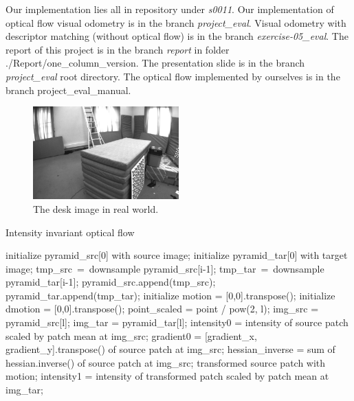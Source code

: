 \documentclass[11pt]{easychair}
\begin{document}
\begin{appendices}
	Our implementation lies all in repository under \emph{s0011}. Our implementation of optical flow visual odometry is in the branch \emph{project\_eval}. Visual odometry with descriptor matching (without optical flow) is in the branch \emph{exercise-05\_eval}. The report of this project is in the branch \emph{report} in folder ./Report/one\_column\_version. The presentation slide is in the branch \emph{project\_eval} root directory. The optical flow implemented by ourselves is in the branch project\_eval\_manual.
	
	\begin{figure}
		\centering
		\includegraphics[width=0.5\textwidth]{img/desk.png}
		\caption{The desk image in real world.}
		\label{fig:desk}
	\end{figure}
	
	\begin{algorithm}[h]
		\caption{Intensity invariant optical flow}  
		\label{alg:optf}
		\begin{algorithmic}[1]
			\State initialize pyramid\_src[0] with source image;
			\State initialize pyramid\_tar[0] with target image;
			\State tmp\_src\ =\ downsample pyramid\_src[i-1];
			\State tmp\_tar\ =\ downsample pyramid\_tar[i-1];
			\State pyramid\_src.append(tmp\_src);
			\State pyramid\_tar.append(tmp\_tar);
			\EndFor
			\State initialize motion = [0,0].transpose();
			\State initialize dmotion = [0,0].transpose();
			\State point\_scaled = point / pow(2, l);
			\State img\_src = pyramid\_src[l];
			\State img\_tar = pyramid\_tar[l];
			\State intensity0 = intensity of source patch scaled by patch mean at img\_src;
			\State gradient0 = [gradient\_x, gradient\_y].transpose() of source patch at img\_src;
			\State hessian\_inverse = sum of hessian.inverse() of source patch at img\_src;
			\State transformed source patch with motion;
			\State intensity1 = intensity of transformed patch scaled by patch mean at img\_tar;
			

\end{algorithmic}
\end{algorithm}
\end{appendices}
\end{document}
